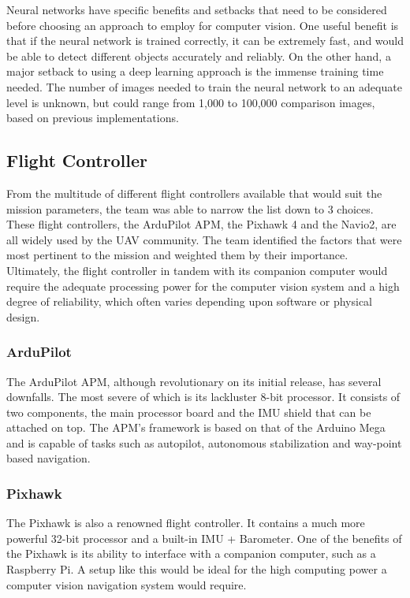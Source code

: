 			Neural networks have specific benefits and setbacks that need to be considered before choosing an approach to employ for computer vision. One useful benefit is that if the neural network is trained correctly, it can be extremely fast, and would be able to detect different objects accurately and reliably. On the other hand, a major setback to using a deep learning approach is the immense training time needed. The number of images needed to train the neural network to an adequate level is unknown, but could range from 1,000 to 100,000 comparison images, based on previous implementations.
	    
	\subsection{Flight Controller}
		From the multitude of different flight controllers available that would suit the mission parameters, the team was able to narrow the list down to 3 choices. These flight controllers, the ArduPilot APM, the Pixhawk 4 and the Navio2, are all widely used by the UAV community. The team identified the factors that were most pertinent to the mission and weighted them by their importance. Ultimately, the flight controller in tandem with its companion computer would require the adequate processing power for the computer vision system and a high degree of reliability, which often varies depending upon software or physical design.

		\subsubsection{ArduPilot}
			The ArduPilot APM, although revolutionary on its initial release, has several downfalls. The most severe of which is its lackluster 8-bit processor. It consists of two components, the main processor board and the IMU shield that can be attached on top. The APM’s framework is based on that of the Arduino Mega and is capable of tasks such as autopilot, autonomous stabilization and way-point based navigation.

		\subsubsection{Pixhawk}
			The Pixhawk is also a renowned flight controller. It contains a much more powerful 32-bit processor and a built-in IMU + Barometer. One of the benefits of the Pixhawk is its ability to interface with a companion computer, such as a Raspberry Pi. A setup like this would be ideal for the high computing power a computer vision navigation system would require.

